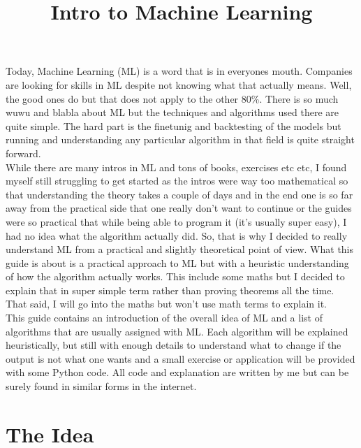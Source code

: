 \documentclass[12pt, letterpaper, twoside]{article}
\title{Intro to Machine Learning}
\begin{document}
\maketitle

Today, Machine Learning (ML) is a word that is in everyones mouth. Companies are looking for skills in ML despite not knowing what that actually means. Well, the good ones do but that does not apply to the other 80\%. There is so much wuwu and blabla about ML but the techniques and algorithms used there are quite simple. The hard part is the finetunig and backtesting of the models but running and understanding any particular algorithm in that field is quite straight forward. \\
While there are many intros in ML and tons of books, exercises etc etc, I found myself still struggling to get started as the intros were way too mathematical so that understanding the theory takes a couple of days and in the end one is so far away from the practical side that one really don't want to continue or the guides were so practical that while being able to program it (it's usually super easy), I had no idea what the algorithm actually did. So, that is why I decided to really understand ML from a practical and slightly theoretical point of view. What this guide is about is a practical approach to ML but with a heuristic understanding of how the algorithm actually works. This include some maths but I decided to explain that in super simple term rather than proving theorems all the time. That said, I will go into the maths but won't use math terms to explain it. \\
This guide contains an introduction of the overall idea of ML and a list of algorithms that are usually assigned with ML. Each algorithm will be explained heuristically, but still with enough details to understand what to change if the output is not what one wants and a small exercise or application will be provided with some Python code. All code and explanation are written by me but can be surely found in similar forms in the internet.

\section{The Idea}
\end{document}
